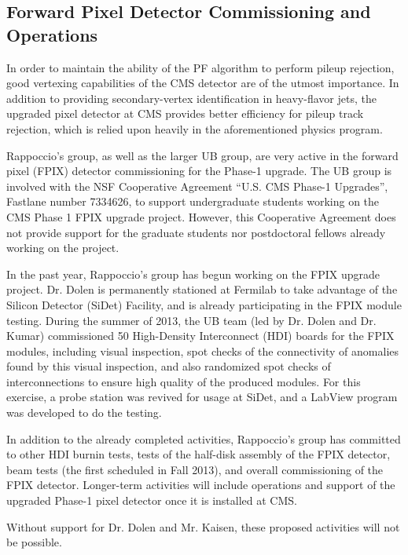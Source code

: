\documentclass[12pt]{proposalnsf}
\begin{document}
\subsection{Forward Pixel Detector Commissioning and Operations} 

In order to maintain the ability of the PF algorithm to perform pileup
rejection, good vertexing capabilities of the CMS detector are of the
utmost importance. In addition to providing secondary-vertex
identification in heavy-flavor jets, the upgraded pixel detector at
CMS provides better efficiency for pileup track rejection, which is
relied upon heavily in the aforementioned physics program. 

Rappoccio's group, as well as the larger UB group, are very active in
the forward pixel (FPIX) detector
commissioning for the Phase-1 upgrade. The UB group is involved with
the NSF Cooperative Agreement ``U.S. CMS Phase-1 Upgrades'', Fastlane
number 7334626, to support undergraduate students working on the
CMS Phase 1 FPIX upgrade project. 
However, this Cooperative Agreement does not provide support
for the graduate students nor postdoctoral fellows already working on
the project. 

In the past year, Rappoccio's group has begun working on the FPIX
upgrade project. Dr. Dolen is permanently stationed at Fermilab to
take advantage of the Silicon Detector (SiDet) Facility, and is
already participating in the FPIX module testing. During the
summer of 2013, the UB team (led by Dr. Dolen and Dr. Kumar)
commissioned 50 High-Density Interconnect
(HDI) boards for the FPIX modules, including visual inspection, spot
checks of the connectivity of anomalies found by this visual
inspection, and also randomized spot checks of interconnections to
ensure high quality of the produced modules. For this exercise, a
probe station was revived for usage at
SiDet, and a LabView program was developed to do the testing.

In addition to the already completed activities, Rappoccio's group has
committed to other HDI burnin tests, tests of the half-disk assembly
of the FPIX detector, beam tests (the first scheduled in Fall 2013),
and overall commissioning of the FPIX detector. Longer-term activities
will include operations and support of the upgraded Phase-1 pixel
detector once it is installed at CMS. 

Without support for Dr. Dolen and Mr. Kaisen, these proposed
activities will not be possible. 

\clearpage
\end{document}
